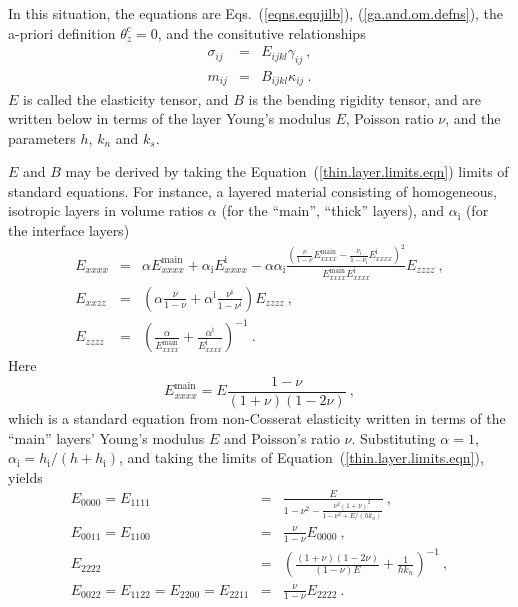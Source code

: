 \documentclass[]{scrreprt}
\newcommand{\thetac}{\theta^{\mathrm{c}}}
\begin{document}
In this situation, the equations
are Eqs.~(\ref{eqns.equjilb}), (\ref{ga.and.om.defns}), the a-priori
definition $\thetac_{z}=0$, and the
consitutive relationships
\begin{eqnarray}
\sigma_{ij} & = & E_{ijkl}\gamma_{ij} \ , \\
m_{ij} & = & B_{ijkl}\kappa_{ij} \ .
\end{eqnarray}
$E$ is called the elasticity tensor, and $B$ is the bending rigidity
tensor, and are written below in terms of the layer Young's modulus
$E$, Poisson ratio $\nu$, and the parameters $h$, $k_{n}$ and $k_{s}$.

$E$ and $B$ may be derived by taking the
Equation~(\ref{thin.layer.limits.eqn}) limits of standard equations.
For instance, a layered material consisting of homogeneous, isotropic
layers in volume ratios $\alpha$ (for the ``main'', ``thick'' layers),
and $\alpha_{\mathrm{i}}$ (for the interface layers)
\begin{eqnarray}
E_{xxxx} & = & \alpha E_{xxxx}^{\mathrm{main}} + \alpha_{\mathrm{i}}E_{xxxx}^{\mathrm{i}} -
\alpha\alpha_{\mathrm{i}} \frac{ \left(
  \frac{\nu}{1-\nu}E_{xxxx}^{\mathrm{main}} - \frac{\nu_{\mathrm{i}}}{1 -
    \nu_{\mathrm{i}}}E_{xxxx}^{\mathrm{i}} \right)^{2}
}{E_{xxxx}^{\mathrm{main}}E_{xxxx}^{\mathrm{i}}} E_{zzzz} \ , \\
E_{xxzz} & = & \left( \alpha \frac{\nu}{1-\nu} +
\alpha^{\mathrm{i}}\frac{\nu^{\mathrm{i}}}{1-\nu^{\mathrm{i}}} \right) E_{zzzz} \ , \\
E_{zzzz} & = & \left( \frac{\alpha}{E_{xxxx}^{\mathrm{main}}} +
\frac{\alpha^{\mathrm{i}}}{E_{xxxx}^{\mathrm{i}}} \right)^{-1} \ .
\end{eqnarray}
Here
\begin{equation}
E_{xxxx}^{\mathrm{main}} = E\frac{1-\nu}{(1 + \nu)(1 - 2\nu)} \ ,
\end{equation}
which is a standard equation from non-Cosserat elasticity written in
terms of the ``main'' layers' Young's modulus $E$ and Poisson's
ratio $\nu$.  Substituting $\alpha = 1$, $\alpha_{\mathrm{i}} =
h_{\mathrm{i}}/(h + h_{\mathrm{i}})$, and taking the limits of
Equation~(\ref{thin.layer.limits.eqn}), yields
\begin{eqnarray}
E_{0000} = E_{1111} & = & \frac{E}{1 - \nu^{2} -
  \frac{\nu^{2}(1+\nu)^{2}}{1 - \nu^{2} + E/(hk_{n})}} \ , \nonumber
\\
E_{0011} = E_{1100} & = & \frac{\nu}{1-\nu}E_{0000} \ , \nonumber \\
E_{2222} & = & \left( \frac{(1+\nu)(1-2\nu)}{(1-\nu)E} +
\frac{1}{hk_{n}} \right)^{-1} \ , \nonumber \\
E_{0022} = E_{1122} = E_{2200} = E_{2211} & = &
\frac{\nu}{1-\nu}E_{2222} \ .
\end{eqnarray}
\end{document}
